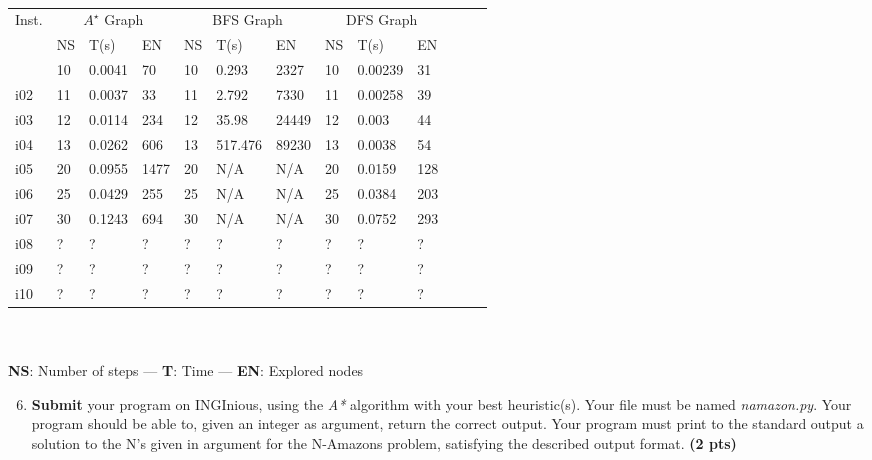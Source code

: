 \documentclass[11pt,a4paper]{report}
\begin{document}
~ 

\begin{answers}[6.5cm]
\begin{center}
\begin{tabular}{||l||l|l|l||l|l|l||l|l|l||l|l|l||}
\hline
\multirow{3}{*}{Inst.} & \multicolumn{3}{c||}{$A^{\star}$ Graph}& \multicolumn{3}{c||}{BFS Graph} & \multicolumn{3}{c||}{DFS Graph}\\
 & NS & T(s) & EN & NS & T(s) & EN & NS & T(s) & EN\\
\hline
i01 & 10 & 0.0041 & 70 & 10 & 0.293 & 2327 & 10 & 0.00239& 31\\
\hline
i02 & 11 & 0.0037 & 33 & 11 & 2.792 & 7330 & 11 & 0.00258& 39\\
\hline
i03 & 12 & 0.0114 & 234 & 12 & 35.98 & 24449 & 12 & 0.003& 44\\
\hline
i04 & 13 & 0.0262 & 606 & 13 & 517.476 & 89230 & 13 & 0.0038& 54 \\
\hline
i05 & 20 & 0.0955 & 1477 & 20 & N/A& N/A& 20 & 0.0159& 128\\
\hline
i06 & 25 & 0.0429 & 255 & 25 & N/A& N/A& 25 & 0.0384& 203\\
\hline
i07 & 30 & 0.1243 & 694 & 30 & N/A& N/A& 30 & 0.0752& 293\\
\hline
i08 & ? & ? & ? & ? & ? & ? & ? & ? & ? \\
\hline
i09 & ? & ? & ? & ? & ? & ? & ? & ? & ? \\
\hline
i10 & ? & ? & ? & ? & ? & ? & ? & ? & ? \\
\hline
\end{tabular}\\

~\\
\textbf{NS}: Number of steps — \textbf{T}: Time — \textbf{EN}: Explored nodes
\end{center}
\end{answers}



\begin{enumerate}
\setcounter{enumi}{5}
\item \textbf{Submit} your program on INGInious, using the \textit{A*} algorithm with your best heuristic(s).
		 Your file must be named \emph{namazon.py}. 
      Your program should be able to, given an integer as argument, return the correct output.
		 Your program must print to the standard output a solution to the N's given in argument for the N-Amazons problem, satisfying the described output format. \textbf{(2 pts)}
\end{enumerate}
\end{document}
